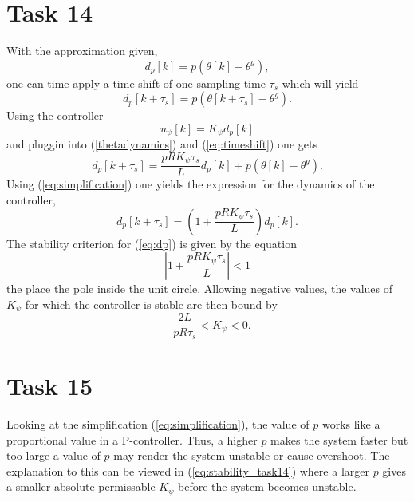 \documentclass[a4paper,12pt,oneside,onecolumn]{article} %
\begin{document}
\section*{Task 14}

With the approximation given,
\begin{equation}
\label{eq:simplification}
d_p[k] = p(\theta[k] - \theta^g),
\end{equation}
one can time apply a time shift of one sampling time $\tau_s$ which will yield
\begin{equation}
\label{eq:timeshift}
d_p[k + \tau_s] = p(\theta[k + \tau_s] - \theta^g).
\end{equation}
Using the controller 
\begin{equation}
u_\psi[k] = K_\psi d_p[k]
\end{equation}
and pluggin into (\ref{thetadynamics}) and (\ref{eq:timeshift}) one gets
\begin{equation}
d_p[k + \tau_s] = \frac{p R K_\psi \tau_s}{L} d_p[k] + p(\theta[k] - \theta^g).
\end{equation}
Using (\ref{eq:simplification}) one yields the expression for the dynamics of the controller,
\begin{equation}
\label{eq:dp}
d_p[k+\tau_s] = \left ( 1 + \frac{p R K_\psi \tau_s}{L} \right ) d_p[k].
\end{equation}
The stability criterion for (\ref{eq:dp}) is given by the equation
\begin{equation}
    \label{eq:stability_task14}
\left | 1 + \frac{p R K_\psi \tau_s}{L} \right | < 1
\end{equation}
the place the pole inside the unit circle.
Allowing negative values, the values of $K_\psi$ for which the controller is
stable are then bound by
\begin{equation}
-\frac{2L}{p R \tau_s} < K_\psi < 0.
\end{equation}
\section*{Task 15}
Looking at the simplification (\ref{eq:simplification}), the value of $p$ works
like a proportional value in a P-controller. Thus, a higher $p$ makes the system
faster but too large a value of $p$ may render the system unstable or cause
overshoot. The explanation to this can be viewed in (\ref{eq:stability_task14})
where a larger $p$ gives a smaller absolute permissable $K_\psi$ before the
system becomes unstable.
\end{document}
